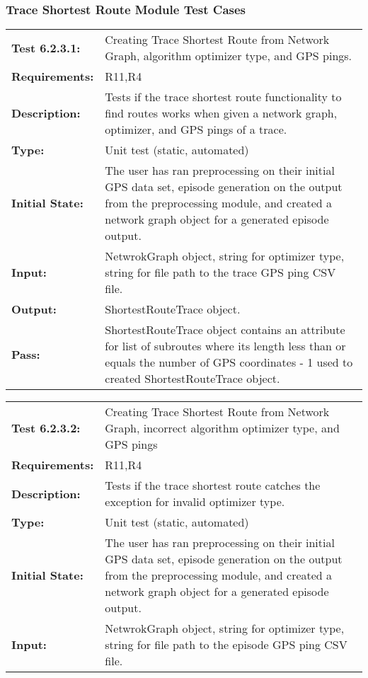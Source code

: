 \documentclass[12pt, titlepage]{article}
\begin{document}
{\subsubsection{Trace Shortest Route Module Test Cases}
\begin{tabular}{|l|p{10cm}|}
    \hline
    \bf{Test} 6.2.3.1: & Creating Trace Shortest Route from Network Graph, algorithm optimizer type, and GPS pings. \\
    \bf{Requirements}: & R11,R4 \\
    \bf{Description}: & Tests if the trace shortest route functionality to find routes works when given a network graph, optimizer, and GPS pings of a trace. \\
    \bf{Type}: & Unit test (static, automated) \\
    \bf{Initial State}: & The user has ran preprocessing on their initial GPS data set, episode generation on the output from the preprocessing module, and created a network graph object for a generated episode output. \\
    \bf{Input}: & NetwrokGraph object, string for optimizer type, string for file path to the trace GPS ping CSV file. \\
    \bf{Output}: & ShortestRouteTrace object. \\
    \bf{Pass}: & ShortestRouteTrace object contains an attribute for list of subroutes where its length less than or equals the number of GPS coordinates - 1 used to created ShortestRouteTrace object. \\
    \hline
\end{tabular}
\begin{tabular}{|l|p{10cm}|}
    \hline
    \bf{Test} 6.2.3.2: & Creating Trace Shortest Route from Network Graph, incorrect algorithm optimizer type, and GPS pings \\
    \bf{Requirements}: & R11,R4 \\
    \bf{Description}: & Tests if the trace shortest route catches the exception for invalid optimizer type. \\
    \bf{Type}: & Unit test (static, automated) \\
    \bf{Initial State}: & The user has ran preprocessing on their initial GPS data set, episode generation on the output from the preprocessing module, and created a network graph object for a generated episode output. \\
    \bf{Input}: & NetwrokGraph object, string for optimizer type, string for file path to the episode GPS ping CSV file. \\

\end{tabular}}
\end{document}
